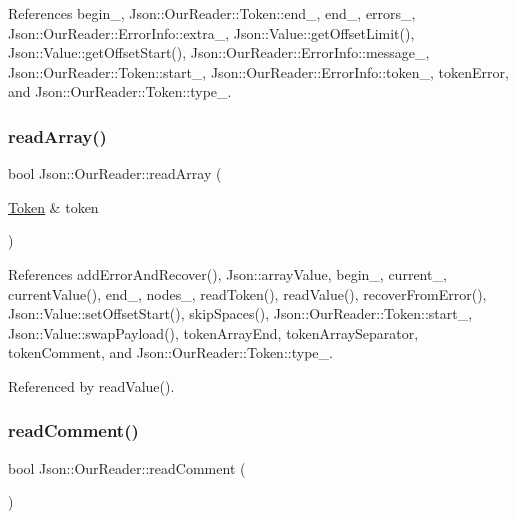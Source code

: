 References begin\+\_\+, Json\+::\+Our\+Reader\+::\+Token\+::end\+\_\+, end\+\_\+, errors\+\_\+, Json\+::\+Our\+Reader\+::\+Error\+Info\+::extra\+\_\+, Json\+::\+Value\+::get\+Offset\+Limit(), Json\+::\+Value\+::get\+Offset\+Start(), Json\+::\+Our\+Reader\+::\+Error\+Info\+::message\+\_\+, Json\+::\+Our\+Reader\+::\+Token\+::start\+\_\+, Json\+::\+Our\+Reader\+::\+Error\+Info\+::token\+\_\+, token\+Error, and Json\+::\+Our\+Reader\+::\+Token\+::type\+\_\+.

\mbox{\label{classJson_1_1OurReader_a0b9f58faf4212c6ecb5d8e2a1ac10257_a0b9f58faf4212c6ecb5d8e2a1ac10257}} 
\subsubsection{\texorpdfstring{read\+Array()}{readArray()}}
{\footnotesize\ttfamily bool Json\+::\+Our\+Reader\+::read\+Array (\begin{DoxyParamCaption}\item[{\hyperlink{classJson_1_1OurReader_1_1Token}{Token} \&}]{token }\end{DoxyParamCaption})\hspace{0.3cm}{\ttfamily [private]}}



References add\+Error\+And\+Recover(), Json\+::array\+Value, begin\+\_\+, current\+\_\+, current\+Value(), end\+\_\+, nodes\+\_\+, read\+Token(), read\+Value(), recover\+From\+Error(), Json\+::\+Value\+::set\+Offset\+Start(), skip\+Spaces(), Json\+::\+Our\+Reader\+::\+Token\+::start\+\_\+, Json\+::\+Value\+::swap\+Payload(), token\+Array\+End, token\+Array\+Separator, token\+Comment, and Json\+::\+Our\+Reader\+::\+Token\+::type\+\_\+.



Referenced by read\+Value().

\mbox{\label{classJson_1_1OurReader_a90f6bb9e55b2bc3d6c1880809495c222_a90f6bb9e55b2bc3d6c1880809495c222}} 
\subsubsection{\texorpdfstring{read\+Comment()}{readComment()}}
{\footnotesize\ttfamily bool Json\+::\+Our\+Reader\+::read\+Comment (\begin{DoxyParamCaption}{ }\end{DoxyParamCaption})\hspace{0.3cm}{\ttfamily [private]}}



